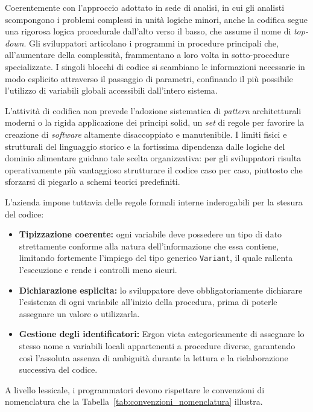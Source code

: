 Coerentemente con l'approccio adottato in sede di analisi, in cui gli analisti scompongono i problemi complessi in unità logiche minori, anche la codifica segue una rigorosa logica procedurale dall'alto verso il basso, che assume il nome di \textit{top-down}. Gli sviluppatori articolano i programmi in procedure principali che, all'aumentare della complessità, frammentano a loro volta in sotto-procedure specializzate. I singoli blocchi di codice si scambiano le informazioni necessarie in modo esplicito attraverso il passaggio di parametri, confinando il più possibile l'utilizzo di variabili globali accessibili dall'intero sistema.

L'attività di codifica non prevede l'adozione sistematica di \textit{pattern} architetturali moderni o la rigida applicazione dei principi \gls{solid}, un \textit{set} di regole per favorire la creazione di \textit{software} altamente disaccoppiato e manutenibile. I limiti fisici e strutturali del linguaggio storico e la fortissima dipendenza dalle logiche del dominio alimentare guidano tale scelta organizzativa: per gli sviluppatori risulta operativamente più vantaggioso strutturare il codice caso per caso, piuttosto che sforzarsi di piegarlo a schemi teorici predefiniti.

L'azienda impone tuttavia delle regole formali interne inderogabili per la stesura del codice:
\begin{itemize}
    \item \textbf{Tipizzazione coerente:} ogni variabile deve possedere un tipo di dato strettamente conforme alla natura dell'informazione che essa contiene, limitando fortemente l'impiego del tipo generico \texttt{Variant}, il quale rallenta l'esecuzione e rende i controlli meno sicuri.
    \item \textbf{Dichiarazione esplicita:} lo sviluppatore deve obbligatoriamente dichiarare l'esistenza di ogni variabile all'inizio della procedura, prima di poterle assegnare un valore o utilizzarla.
    \item \textbf{Gestione degli identificatori:} Ergon vieta categoricamente di assegnare lo stesso nome a variabili locali appartenenti a procedure diverse, garantendo così l'assoluta assenza di ambiguità durante la lettura e la rielaborazione successiva del codice.
\end{itemize}

A livello lessicale, i programmatori devono rispettare le convenzioni di nomenclatura che la Tabella~\ref{tab:convenzioni_nomenclatura} illustra.

